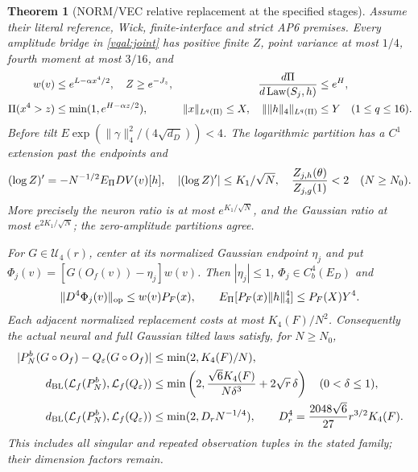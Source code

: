 \documentclass[11pt]{article}
\theoremstyle{plain}
\newtheorem{theorem}{Theorem}[section]
\theoremstyle{definition}
\theoremstyle{remark}
\DeclareMathOperator{\Law}{Law}
\begin{document}
\begin{theorem}[NORM/VEC relative replacement at the specified stages]
\label{vqal:relative-theorem}
Assume their literal reference, Wick, finite-interface and strict AP6
premises. Every amplitude bridge in \eqref{vqal:joint} has positive
finite $Z$, point variance at most $1/4$, fourth moment at most $3/16$,
and
\begin{align}\label{vqal:jointbounds}
 w(v)&\le e^{L-\alpha x^4/2},\quad Z\ge e^{-J_z},
 &{d\Pi\over d\Law(S_j,h)}&\le e^H,\nonumber\\
 \Pi(x^4>z)&\le\min(1,e^{H-\alpha z/2}),
 &\|x\|_{L^q(\Pi)}\le X,\quad\|\|h\|_4\|_{L^q(\Pi)}
     &\le Y\quad(1\le q\le16).
\end{align}
Before tilt $E\exp(\|\gamma\|_4^2/(4\sqrt{d_D}))<4$.
The logarithmic partition has a $C^1$ extension past the endpoints and
\begin{equation}\label{vqal:ratios}
 (\log Z)'=-N^{-1/2}E_\Pi DV(v)[h],\quad
 |(\log Z)'|\le K_1/\sqrt N,
 \quad {Z_{j,h}(\theta)\over Z_{j,g}(1)}<2\quad(N\ge N_0).
\end{equation}
More precisely the neuron ratio is at most $e^{K_1/\sqrt N}$, and the
Gaussian ratio at most $e^{2K_1/\sqrt N}$; the zero-amplitude partitions
agree.

For $G\in\mathcal U_4(r)$, center at its normalized Gaussian endpoint
$\eta_j$ and put $\Phi_j(v)=[G(O_f(v))-\eta_j]w(v)$. Then
$|\eta_j|\le1$, $\Phi_j\in C_b^4(E_D)$ and
\begin{equation}\label{vqal:centered}
 \|D^4\Phi_j(v)\|_{\rm op}\le w(v)P_F(x),\qquad
 E_\Pi[P_F(x)\|h\|_4^4]\le P_F(X)Y^4.
\end{equation}
Each adjacent normalized replacement costs at most $K_4(F)/N^2$.
Consequently the actual neural and full Gaussian tilted laws satisfy,
for $N\ge N_0$,
\begin{align}\label{vqal:relativeBL}
 |P_N^b(G\circ O_f)-Q_\varepsilon(G\circ O_f)|
 &\le\min(2,K_4(F)/N),\nonumber\\
 d_{\rm BL}(\mathcal L_f(P_N^b),\mathcal L_f(Q_\varepsilon))
 &\le\min\left(2,{\sqrt6K_4(F)\over N\delta^3}
                                   +2\sqrt r\,\delta\right)
 \quad(0<\delta\le1),\nonumber\\
 d_{\rm BL}(\mathcal L_f(P_N^b),\mathcal L_f(Q_\varepsilon))
 &\le\min(2,D_rN^{-1/4}),\qquad
 D_r^4={2048\sqrt6\over27}r^{3/2}K_4(F).
\end{align}
This includes all singular and repeated observation tuples in the stated
family; their dimension factors remain.
\end{theorem}
\end{document}
